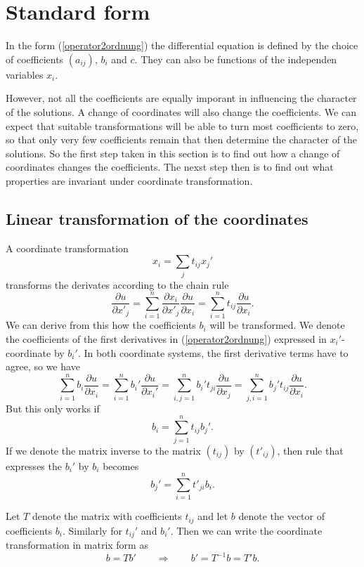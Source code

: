 %
%
%
\section{Standard form}
In the form (\ref{operator2ordnung})
the differential equation is defined by the choice of coefficients
$(a_{ij})$, $b_i$ and $c$.
They can also be functions of the independen variables $x_i$.

However, not all the coefficients are equally imporant in influencing
the character of the solutions.
A change of coordinates will also change the coefficients.
We can expect that suitable transformations will be able to turn
most coefficients to zero, so that only very few coefficients remain
that then determine the character of the solutions.
So the first step taken in this section is to find out how a change
of coordinates changes the coefficients.
The nexst step then is to find out what properties are invariant
under coordinate transformation.

\subsection{Linear transformation of the coordinates
\label{lineare-transformation}}
A coordinate transformation
\[
x_i=\sum_{j}t_{ij}x_j'
\]
transforms the derivates according to the chain rule
\[
\frac{\partial u}{\partial x'_j}
=
\sum_{i=1}^n
\frac{\partial x_i}{\partial x'_j} \frac{\partial u}{\partial x_i}
=
\sum_{i=1}^nt_{ij}\frac{\partial u}{\partial x_i}.
\]
We can derive from this how the coefficients $b_i$ will be transformed.
We denote the coefficients of the first derivatives in
(\ref{operator2ordnung}) expressed in $x_i'$-coordinate by $b_i'$.
In both coordinate systems, the first derivative terms have to agree, so
we have
\[
\sum_{i=1}^n b_i\frac{\partial u}{\partial x_i}
=
\sum_{i=1}^n b_i'\frac{\partial u}{\partial x_i'}
=
\sum_{i,j=1}^n b_i't_{ji}\frac{\partial u}{\partial x_j}
=
\sum_{j,i=1}^n b_j't_{ij}\frac{\partial u}{\partial x_i}.
\]
But this only works if
\[
b_i = \sum_{j=1}^n t_{ij}b_j'.
\]
If we denote the matrix inverse to the matrix $(t_{ij})$ by $(t'_{ij})$,
then rule that expresses the $b_i'$ by $b_i$ becomes
\[
b_j'=\sum_{i=1}^n t'_{ji}b_i.
\]

Let $T$ denote the matrix with coefficients $t_{ij}$ and let $b$
denote the vector of coefficients $b_i$.
Similarly for $t_{ij}'$ and $b_i'$.
Then we can write the coordinate transformation in matrix form as
\[
b=Tb'
\qquad\Rightarrow\qquad
b'=T^{-1}b=T'b.
\]

